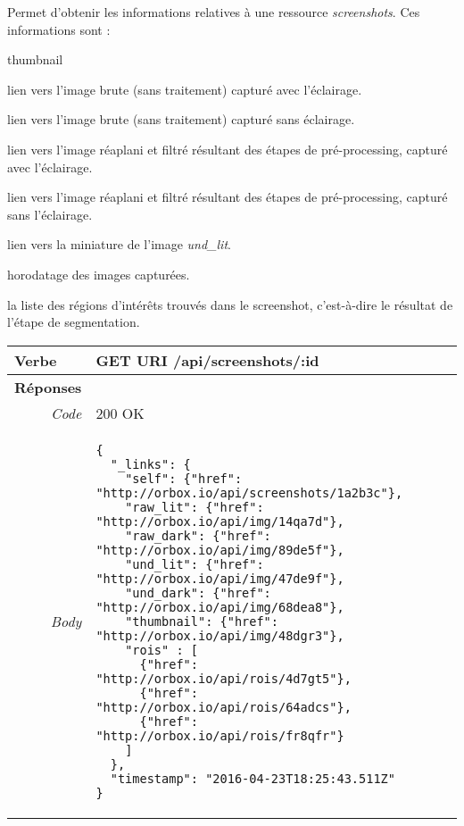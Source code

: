 \begin{appendices}
\begin{absolutelynopagebreak}
Permet d'obtenir les informations relatives à une ressource \emph{screenshots}.
Ces informations sont :
\begin{labeling}[~--]{thumbnail}
    \item [raw\_lit] lien vers l'image brute (sans traitement) capturé avec l'éclairage.
    \item [raw\_dark] lien vers l'image brute (sans traitement) capturé sans éclairage.
    \item [und\_lit] lien vers l'image réaplani et filtré résultant des étapes de pré-processing, capturé avec l'éclairage.
    \item [und\_dark] lien vers l'image réaplani et filtré résultant des étapes de pré-processing, capturé sans l'éclairage. 
    \item [thumbnail] lien vers la miniature de l'image \emph{und\_lit}.
    \item [timestamp] horodatage des images capturées.
    \item [rois] la liste des régions d'intérêts trouvés dans le screenshot, c'est-à-dire le résultat de l'étape de segmentation.
\end{labeling}


\begin{tabular}{@{}p{2cm}p{11.5cm}@{}}
    \toprule
    \textbf{Verbe}                        & GET \hspace{2.5cm} \textbf{URI} \hspace{0.25cm} /api/screenshots/:id   \\ \midrule
    \textbf{Réponses}                     &        \\
    \multicolumn{1}{r}{\textit{Code}}   & 200 OK \\
    \multicolumn{1}{r}{\textit{Body}}   & \begin{verbatim}
{
  "_links": {
    "self": {"href": "http://orbox.io/api/screenshots/1a2b3c"},
    "raw_lit": {"href": "http://orbox.io/api/img/14qa7d"},
    "raw_dark": {"href": "http://orbox.io/api/img/89de5f"},
    "und_lit": {"href": "http://orbox.io/api/img/47de9f"},
    "und_dark": {"href": "http://orbox.io/api/img/68dea8"},
    "thumbnail": {"href": "http://orbox.io/api/img/48dgr3"},
    "rois" : [
      {"href": "http://orbox.io/api/rois/4d7gt5"},
      {"href": "http://orbox.io/api/rois/64adcs"},
      {"href": "http://orbox.io/api/rois/fr8qfr"}
    ]
  },
  "timestamp": "2016-04-23T18:25:43.511Z"
}
    \end{verbatim}
    \label{jsonHalScreenshots}
    \\ \bottomrule
\end{tabular}
\end{absolutelynopagebreak}


\end{appendices}
